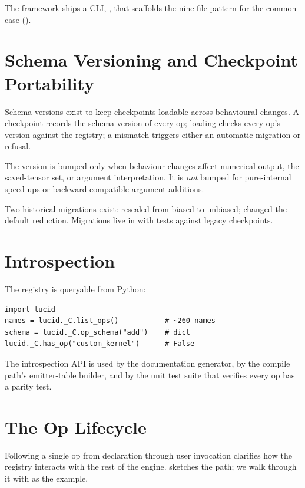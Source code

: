 The framework ships a CLI, , that
scaffolds the nine-file pattern for the common case
().

\section{Schema Versioning and Checkpoint Portability}
\label{sec:op_registry:versioning}

Schema versions exist to keep checkpoints loadable across
behavioural changes. A checkpoint records the schema version of
every op; loading checks every op's version against the registry;
a mismatch triggers either an automatic migration or refusal.

The version is bumped only when behaviour changes affect numerical
output, the saved-tensor set, or argument interpretation. It is
\emph{not} bumped for pure-internal speed-ups or
backward-compatible argument additions.

Two historical migrations exist: 
rescaled  from biased to unbiased;  changed the default reduction. Migrations live in
 with tests against legacy
checkpoints.

\section{Introspection}
\label{sec:op_registry:introspection}

The registry is queryable from Python:

\begin{lstlisting}[style=lucid,language=LucidPython]
import lucid
names = lucid._C.list_ops()           # ~260 names
schema = lucid._C.op_schema("add")    # dict
lucid._C.has_op("custom_kernel")      # False
\end{lstlisting}

The introspection API is used by the documentation generator, by
the compile path's emitter-table builder, and by the unit test
suite that verifies every op has a parity test.

\section{The Op Lifecycle}
\label{sec:op_registry:lifecycle}

Following a single op from declaration through user invocation
clarifies how the registry interacts with the rest of the engine.
 sketches the path; we walk
through it with  as the example.

